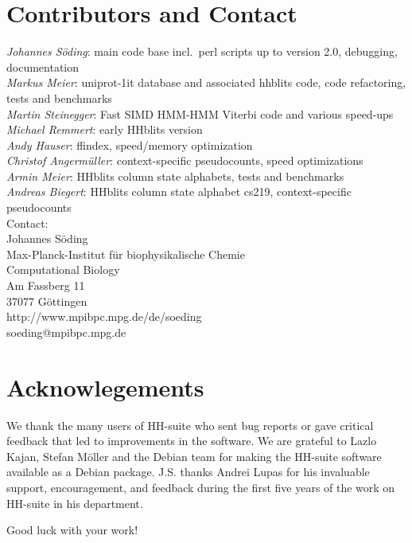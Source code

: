 \documentclass[11pt,a4paper]{article}
\begin{document}
\section{Contributors and Contact}

\emph{Johannes S\"oding}: main code base incl.\ perl scripts up to version 2.0, debugging, documentation\\ [1mm]
\emph{Markus Meier}: uniprot-1it database and associated hhblits code, code refactoring, tests and benchmarks\\[1mm]
\emph{Martin Steinegger}: Fast SIMD HMM-HMM Viterbi code and various speed-ups\\[1mm]
\emph{Michael Remmert}: early HHblits version\\[1mm]
\emph{Andy Hauser}: ffindex, speed/memory optimization\\[1mm]
\emph{Christof Angerm\"uller}: context-specific pseudocounts, speed optimizations\\[1mm]
\emph{Armin Meier}: HHblits column state alphabets, tests and benchmarks\\[1mm]
\emph{Andreas Biegert}: HHblits column state alphabet cs219, context-specific pseudocounts\\[1mm]

Contact:\\[2mm]
Johannes S\"oding\\
Max-Planck-Institut für biophysikalische Chemie\\
Computational Biology\\
Am Fassberg 11\\
37077 G\"ottingen\\
http://www.mpibpc.mpg.de/de/soeding\\
soeding@mpibpc.mpg.de
\section{Acknowlegements}

We thank the many users of HH-suite who sent bug reports or gave critical feedback that led to improvements in the software. 
We are grateful to Lazlo Kajan, Stefan M\"oller and the Debian team for making the HH-suite software available as a Debian package. J.S. thanks Andrei Lupas for his invaluable support, encouragement, and feedback during the first five years of the work on HH-suite in his department.

%


 


\vspace{20mm}
\begin{center}
Good luck with your work!

\end{center}
\end{document}
